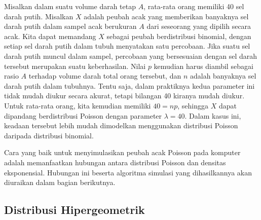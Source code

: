 \begin{example}\label{exam 5.5.5} Misalkan dalam suatu volume darah tetap $A$, rata-rata
orang memiliki 40 sel darah putih. Misalkan $X$ adalah peubah acak yang memberikan
banyaknya sel darah putih dalam sampel acak berukuran $A$ dari seseorang yang dipilih
secara acak. Kita dapat memandang $X$ sebagai peubah berdistribusi binomial, dengan setiap
sel darah putih dalam tubuh menyatakan satu percobaan. Jika suatu sel darah putih muncul
dalam sampel, percobaan yang bersesuaian dengan sel darah tersebut merupakan suatu
keberhasilan. Nilai $p$ kemudian harus diambil sebagai rasio $A$ terhadap volume darah
total orang tersebut, dan $n$ adalah banyaknya sel darah putih dalam tubuhnya. Tentu saja,
dalam praktiknya kedua parameter ini tidak mudah diukur secara akurat, tetapi bilangan 40
kiranya mudah diukur. Untuk rata-rata orang, kita kemudian memiliki $40 = np$, sehingga
$X$ dapat dipandang berdistribusi Poisson dengan parameter $\lambda = 40$. Dalam kasus
ini, keadaan tersebut lebih mudah dimodelkan menggunakan distribusi Poisson daripada
distribusi binomial.
\end{example}
\par Cara yang baik untuk menyimulasikan peubah acak Poisson pada komputer adalah
memanfaatkan hubungan antara distribusi Poisson dan densitas eksponensial. Hubungan ini
beserta algoritma simulasi yang dihasilkannya akan diuraikan dalam bagian berikutnya.

\subsection*{Distribusi Hipergeometrik}

